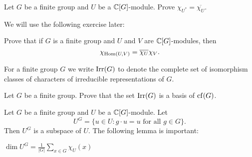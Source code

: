 \begin{exercise}
    Let $G$ be a finite group and $U$ be a $\mathbb{C}[G]$-module.
    Prove  $\chi_{U^*}=\overline{\chi_U}$. 
\end{exercise}

We will use the following exercise later:

\begin{exercise}
\label{xca:char_Hom}
    Prove that if $G$ is a finite group and 
    $U$ and $V$ are $\mathbb{C}[G]$-modules, then 
    \[
        \chi_{\operatorname{Hom}(U,V)}=\overline{\chi_U}\chi_V.
    \] 
\end{exercise}

For a finite group $G$ we write $\operatorname{Irr}(G)$ to denote
the complete set of isomorphism classes of characters of irreducible representations 
of $G$. 

\begin{exercise}
    Let $G$ be a finite group. Prove that the set
    $\operatorname{Irr}(G)$ is a basis
    of $\operatorname{cf}(G)$. 
\end{exercise}

Let $G$ be a finite group and $U$ be a $\mathbb{C}[G]$-module. 
Let 
\[
U^G=\{u\in U:g\cdot u=u\text{ for all $g\in G$}\}.
\]
Then $U^G$ is a subspace of $U$. The following lemma
is important:

\begin{lemma}
    $\dim U^G=\frac{1}{|G|}\sum_{x\in G}\chi_U(x)$
\end{lemma}

